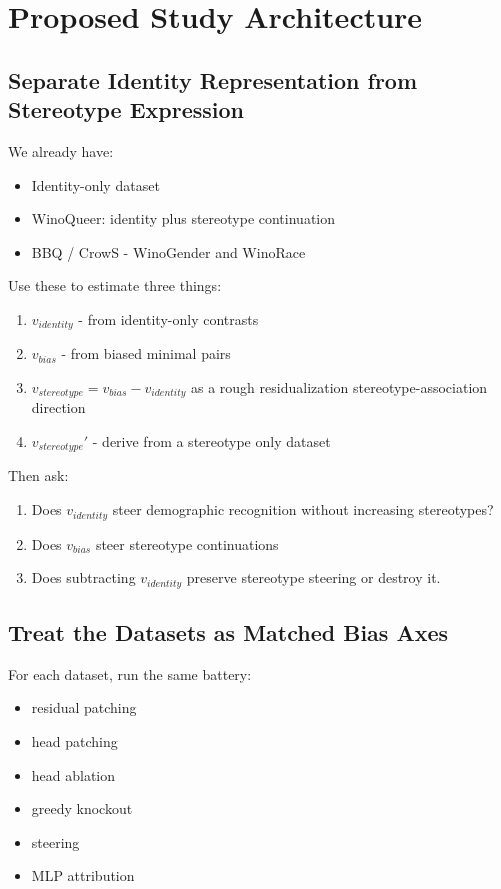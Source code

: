 \section{Proposed Study Architecture}

\subsection{Separate Identity Representation from Stereotype Expression}
We already have: 
\begin{itemize}
    \item Identity-only dataset
    \item WinoQueer: identity plus stereotype continuation
    \item BBQ / CrowS - WinoGender and WinoRace
\end{itemize}

Use these to estimate three things: 
\begin{enumerate}
    \item $v_{identity}$ - from identity-only contrasts
    \item $v_{bias}$ - from biased minimal pairs
    \item $v_{stereotype} = v_{bias} - v_{identity}$ as a rough residualization stereotype-association direction
    \item $v_{stereotype}'$ - derive from a stereotype only dataset 
\end{enumerate}

Then ask: 
\begin{enumerate}
    \item Does $v_{identity}$ steer demographic recognition without increasing stereotypes?
    \item Does $v_{bias}$ steer stereotype continuations
    \item Does subtracting $v_{identity}$ preserve stereotype steering or destroy it. 
\end{enumerate}

\subsection{Treat the Datasets as Matched Bias Axes}
For each dataset, run the same battery: 
\begin{itemize}
    \item residual patching
    \item head patching
    \item head ablation 
    \item greedy knockout
    \item steering 
    \item MLP attribution
\end{itemize}

